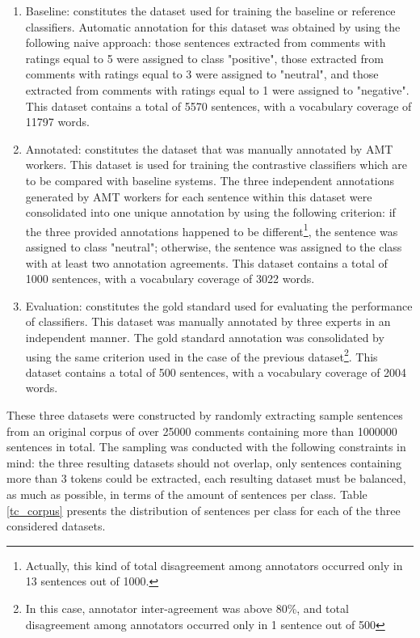 \documentclass[11pt,letterpaper]{article}
\begin{document}
\begin{enumerate}
\item Baseline: constitutes the dataset used for training the baseline or reference classifiers. 
Automatic annotation for this dataset was obtained by using the following naive approach: those sentences extracted from
comments with ratings equal to 5 were assigned to class "positive", those extracted from comments with ratings 
equal to 3 were assigned to "neutral", and those extracted from comments with ratings equal to 1 were assigned to
"negative". This dataset contains a total of 5570 sentences, with a vocabulary coverage of 11797 words. 

\item Annotated: constitutes the dataset that was manually annotated by AMT workers.
This dataset is used for training the contrastive classifiers which are to be compared with baseline systems.
The three independent annotations generated by AMT workers for each sentence within this dataset were consolidated into one unique annotation
by using the following criterion: if the three provided annotations happened to be
different\footnote{Actually, this kind of total disagreement among annotators occurred only in 13 sentences out of 1000.}, 
the sentence was assigned to class "neutral"; otherwise, the sentence was assigned to the class with
at least two annotation agreements. This dataset contains a total of 1000 sentences, with a vocabulary coverage 
of 3022 words. 

\item Evaluation: constitutes the gold standard used for evaluating the performance of classifiers.
This dataset was manually annotated by three experts in an independent manner. The gold standard annotation
was consolidated by using the same criterion used in the case of the previous dataset\footnote{In this case, 
annotator inter-agreement was above 80\%, and total disagreement among annotators occurred only in 1 sentence
out of 500}. This dataset contains a total of 500 sentences, with a vocabulary coverage of 2004 words.    
\end{enumerate} 

These three datasets were constructed by randomly extracting sample sentences from an original corpus
of over 25000 comments containing more than 1000000 sentences in total. The sampling was conducted 
with the following constraints in mind: the three resulting datasets should not overlap, only sentences 
containing more than 3 tokens could be extracted, each resulting dataset must be balanced, as much
as possible, in terms of the amount of sentences per class. Table \ref{tc_corpus} presents the
distribution of sentences per class for each of the three considered datasets.  
\end{document}
